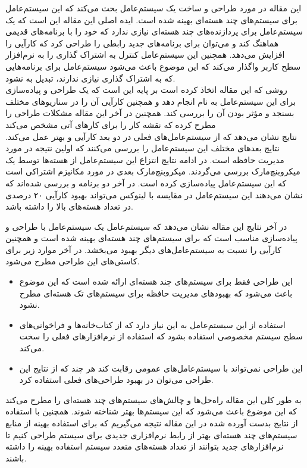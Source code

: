 \documentclass[a4paper, 12pt]{article}
\title{\lr{Corey: An Operating System for Many Cores}}
\author{حسین افکار}
\begin{document}
\maketitle
این مقاله در مورد طراحی و ساخت یک سیستم‌عامل بحث می‌کند که این سیستم‌عامل
برای سیستم‌های چند هسته‌ای بهینه شده است.
ایده اصلی این مقاله این است که یک سیستم‌عامل برای پردازنده‌های چند هسته‌ای نیازی ندارد که
خود را با برنامه‌های قدیمی هماهنگ کند و می‌توان برای برنامه‌های جدید رابطی را طراحی کرد
که کارآیی را افزایش می‌دهد.
همچنین این سیستم‌عامل کنترل به اشتراک گذاری را به نرم‌افزار سطح کاربر واگذار می‌کند
که این موضوع باعث می‌شود سیستم‌عامل برای برنامه‌هایی که به اشتراک گذاری نیازی ندارند،
تبدیل به
نشود. \\
روشی که این مقاله اتخاذ کرده است بر پایه این است که یک طراحی و پیاده‌سازی برای این سیستم‌عامل
به نام
انجام دهد و همچنین کارآیی آن را در سناریو‌های مختلف بسنجد و مؤثر بودن آن‌ را بررسی کند.
همچنین در آخر این مقاله مشکلات طراحی را مطرح کرده که نقشه کار را برای کار‌های آتی مشخص می‌کند \\
نتایج نشان می‌دهد که
از سیستم‌عامل‌های فعلی در دو بعد کارآیی و
بهتر عمل می‌کند.
نتایج بعد‌های مختلف این سیستم‌عامل را بررسی می‌کنند که اولین نتیجه در مورد مدیریت حافظه است.
در ادامه نتایج انتزاع این سیستم‌عامل از هسته‌ها توسط یک میکروبنچ‌مارک
بررسی می‌گردند.
میکروبنچ‌مارک بعدی در مورد مکانیزم اشتراکی است که این سیستم‌عامل پیاده‌سازی کرده است.
در آخر دو برنامه
و
بررسی شده‌اند که نشان می‌دهند این سیستم‌عامل در مقایسه با لینوکس می‌تواند بهبود کارآیی 
۲۰ درصدی
در تعداد هسته‌های بالا را داشته باشد.

در آخر نتایج این مقاله نشان می‌دهد که سیستم‌عامل
یک سیستم‌عامل با طراحی و پیاده‌سازی مناسب است که برای سیستم‌های چند هسته‌ای
بهینه شده است و همچنین کارآیی را نسبت به سیستم‌عامل‌های دیگر بهبود می‌بخشد.
در آخر موارد زیر برای کاستی‌های این طراحی مطرح می‌شود.
\begin{itemize}
    \item این طراحی فقط برای سیستم‌های چند هسته‌ای ارائه شده است
    که این موضوع باعث می‌شود که بهبود‌های مدیریت حافظه برای سیستم‌های تک هسته‌ای مطرح نشود.
    \item استفاده از این سیستم‌عامل به این نیاز دارد که از کتاب‌خانه‌ها و فراخوانی‌های سطح سیستم
    مخصوصی استفاده بشود که استفاده از نرم‌افزار‌های فعلی را سخت می‌کند.
    \item این طراحی نمی‌تواند با سیستم‌عامل‌های عمومی رقابت کند
    هر چند که از نتایج این طراحی می‌توان در بهبود طراحی‌های فعلی استفاده کرد.
\end{itemize}
به طور کلی این مقاله راه‌حل‌ها و چالش‌های سیستم‌های چند هسته‌ای را مطرح می‌کند که این موضوع باعث می‌شود
که این سیستم‌ها بهتر شناخته شوند.
همچنین با استفاده از نتایج بدست‌ آورده شده در این مقاله نتیجه می‌گیریم که برای استفاده
بهینه از منابع سیستم‌های چند هسته‌ای بهتر از رابط نرم‌افزاری جدیدی برای سیستم طراحی کنیم
تا نرم‌افزار‌های جدید بتوانند از تعداد هسته‌های متعدد سیستم استفاده بهینه را داشته باشند.

\end{document}
